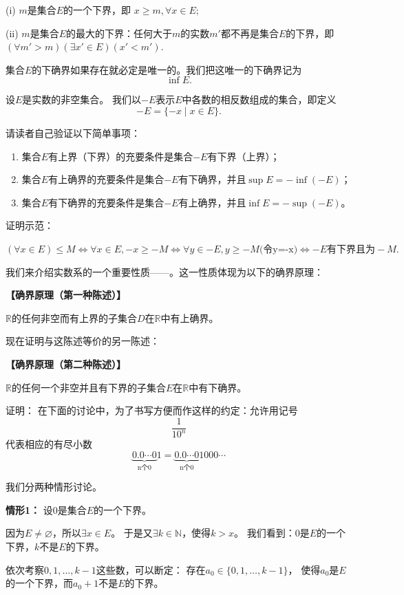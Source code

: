 \documentclass[12pt,a4paper,oneside]{ctexbook}
\begin{document}
(i) $m$是集合$E$的一个下界，即  
$x \geq m, \forall x \in E;$  

(ii) $m$是集合$E$的最大的下界：任何大于$m$的实数$m'$都不再是集合$E$的下界，即  
$(\forall m' > m)(\exists x' \in E)(x' < m').$  

集合$E$的下确界如果存在就必定是唯一的。我们把这唯一的下确界记为$$\inf E.$$


设$E$是实数的非空集合。
我们以$-E$表示$E$中各数的相反数组成的集合，即定义  
$$-E = \{-x \mid x \in E\}.$$  

请读者自己验证以下简单事项：  

\begin{enumerate}
  \item 集合$E$有上界（下界）的充要条件是集合$-E$有下界（上界）；
  \item 集合$E$有上确界的充要条件是集合$-E$有下确界，并且$\sup E = -\inf(-E)$；
  \item 集合$E$有下确界的充要条件是集合$-E$有上确界，并且$\inf E = -\sup(-E)$。
\end{enumerate}

证明示范：

$(\forall x \in E)\leq M \iff \forall x \in E , -x \geq -M \iff \forall y \in -E ,y\geq -M\text{(令y=-x)} \iff -E\text{有下界且为}-M.$

我们来介绍实数系的一个重要性质——。这一性质体现为以下的确界原理：  

\textbf{【确界原理（第一种陈述）】}

$\mathbb{R}$的任何非空而有上界的子集合$D$在$\mathbb{R}$中有上确界。  

现在证明与这陈述等价的另一陈述：  

\textbf{【确界原理（第二种陈述）】} 

$\mathbb{R}$的任何一个非空并且有下界的子集合$E$在$\mathbb{R}$中有下确界。

证明：
在下面的讨论中，为了书写方便而作这样的约定：允许用记号\[\frac{1}{10^n}\]
代表相应的有尽小数
\[\underbrace{0.0\cdots 0}_\text{n个0}1  = \underbrace{0.0\cdots0}_\text{n个0}1000\cdots\]

我们分两种情形讨论。

\textbf{情形1：}  设0是集合$E$的一个下界。

因为$E\neq \varnothing$，所以$\exists x\in E$。
于是又$\exists k\in \mathbb{N}$，使得$k>x$。
我们看到：0是$E$的一个下界，$k$不是$E$的下界。

依次考察$0, 1, \dots, k-1$这些数，可以断定：
存在$a_0\in \{0,1,\dots,k-1\}$，
使得$a_0$是$E$的一个下界，而$a_0+1$不是$E$的下界。
\end{document}
